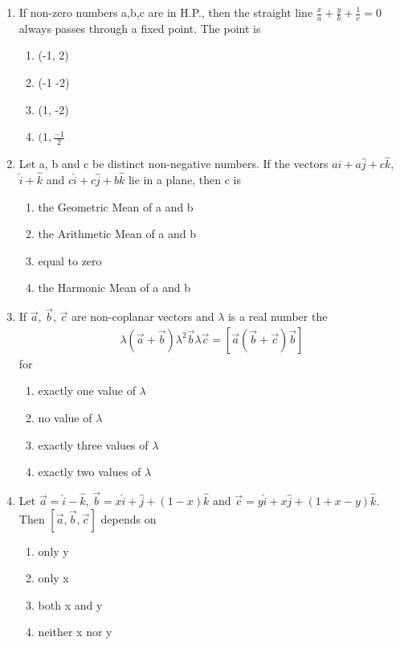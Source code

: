 \begin{enumerate}[label=\arabic*.,ref=\thesubsection.\theenumi]
\item If non-zero numbers a,b,c are in H.P., then the straight line $\frac{x}{a}+\frac{y}{b}+\frac{1}{c}=0$ always passes through a fixed point. The point is
\begin{enumerate}
\item (-1, 2)
\item (-1 -2)
\item (1, -2)
\item $(1, \frac{-1}{2}$
\end{enumerate}

\item Let a, b and c be distinct non-negative numbers. If the vectors $a\hat{i}+a\hat{j}+c\hat{k}$, $\hat{i}+\hat{k}$ and $c\hat{i}+c\hat{j}+b\hat{k}$ lie in a plane, then c is
\begin{enumerate}
\item the Geometric Mean of a and b
\item the Arithmetic Mean of a and b
\item equal to zero
\item the Harmonic Mean of a and b
\end{enumerate}

\item If $\overrightarrow{a}$, $\overrightarrow{b}$, $\overrightarrow{c}$ are non-coplanar vectors and $\lambda$ is a real number the 
\begin{align*}
\lambda(\overrightarrow{a}+\overrightarrow{b})\lambda^{2}\overrightarrow{b}\lambda\overrightarrow{c}=[\overrightarrow{a}  (\overrightarrow{b}+\overrightarrow{c}) \overrightarrow{b}]
\end{align*}
for
\begin{enumerate}
\item exactly one value of $\lambda$
\item no value of $\lambda$
\item exactly three values of $\lambda$
\item exactly two values of $\lambda$
\end{enumerate}

\item Let $\overrightarrow{a}=\hat{i}-\hat{k}$, $\overrightarrow{b}=x\hat{i}+\hat{j}+(1-x)\hat{k}$ and $\overrightarrow{c}=y\hat{i}+x\hat{j}+(1+x-y)\hat{k}$. Then $[\overrightarrow{a},\overrightarrow{b},\overrightarrow{c}]$ depends on
\begin{enumerate}
\item only y
\item only x
\item both x and y
\item neither x nor y
\end{enumerate}


\end{enumerate}
